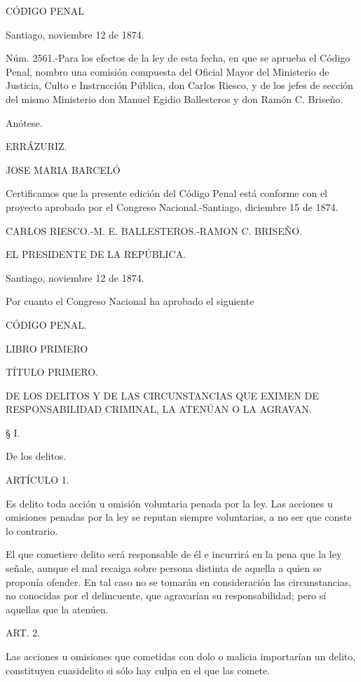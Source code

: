 CÓDIGO PENAL

    Santiago, noviembre 12 de 1874.

    Núm. 2561.-Para los efectos de la ley de esta fecha, en que se aprueba el Código Penal, nombro una comisión compuesta del Oficial Mayor del Ministerio de Justicia, Culto e Instrucción Pública, don Carlos Riesco, y de los jefes de sección del mismo Ministerio don Manuel Egidio Ballesteros y don Ramón C. Briseño.

    Anótese.

    ERRÁZURIZ.

    JOSE MARIA BARCELÓ


    Certificamos que la presente edición del Código Penal está conforme con el proyecto aprobado por el Congreso Nacional.-Santiago, diciembre 15 de 1874.

    CARLOS RIESCO.-M. E. BALLESTEROS.-RAMON C. BRISEÑO.


    EL PRESIDENTE DE LA REPÚBLICA.

    Santiago, noviembre 12 de 1874.

    Por cuanto el Congreso Nacional ha aprobado el siguiente

    CÓDIGO PENAL.

    LIBRO PRIMERO





    TÍTULO PRIMERO.

DE LOS DELITOS Y DE LAS CIRCUNSTANCIAS QUE EXIMEN DE RESPONSABILIDAD CRIMINAL, LA ATENÚAN O LA AGRAVAN.





    § I.

    De los delitos.



    ARTÍCULO 1.

    Es delito toda acción u omisión voluntaria penada por la ley.
    Las acciones u omisiones penadas por la ley se reputan siempre voluntarias, a no ser que conste lo contrario.

    El que cometiere delito será responsable de él e incurrirá en la pena que la ley señale, aunque el mal recaiga sobre persona distinta de aquella a quien se proponía ofender. En tal caso no se tomarán en consideración las circunstancias, no conocidas por el delincuente, que agravarían su responsabilidad; pero sí aquellas que la atenúen.


    ART. 2.

    Las acciones u omisiones que cometidas con dolo o malicia importarían un delito, constituyen cuasidelito si sólo hay culpa en el que las comete.



